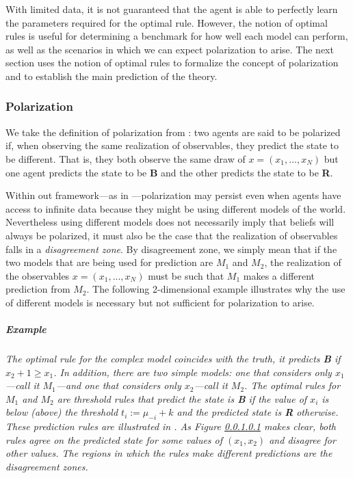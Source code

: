 \documentclass[
  12pt,
]{article}
\begin{document}
With limited data, it is not guaranteed that the agent is able to
perfectly learn the parameters required for the optimal rule. However,
the notion of optimal rules is useful for determining a benchmark for
how well each model can perform, as well as the scenarios in which we
can expect polarization to arise. The next section uses the notion of
optimal rules to formalize the concept of polarization and to establish
the main prediction of the theory.

\hypertarget{polarization}{%
\subsubsection{Polarization}\label{polarization}}

We take the definition of polarization from \citet{Haghtalab2021}: two
agents are said to be polarized if, when observing the same realization
of observables, they predict the state to be different. That is, they
both observe the same draw of \(x=(x_1, ..., x_N)\) but one agent
predicts the state to be \textbf{B} and the other predicts the state to
be \textbf{R}.

Within out framework---as in \citet{Haghtalab2021}---polarization may
persist even when agents have access to infinite data because they might
be using different models of the world. Nevertheless using different
models does not necessarily imply that beliefs will always be polarized,
it must also be the case that the realization of observables falls in a
\emph{disagreement zone}. By disagreement zone, we simply mean that if
the two models that are being used for prediction are \(M_1\) and
\(M_2\), the realization of the observables \(x=(x_1, ..., x_N)\) must
be such that \(M_1\) makes a different prediction from \(M_2\). The
following 2-dimensional example illustrates why the use of different
models is necessary but not sufficient for polarization to arise.

\hypertarget{example}{%
\subparagraph{Example}\label{example}}

\emph{The optimal rule for the complex model coincides with the truth,
it predicts \textbf{B} if \(x_2+1\geq x_1\). In addition, there are two
simple models: one that considers only \(x_1\)---call it \(M_1\)---and
one that considers only \(x_2\)---call it \(M_2\). The optimal rules for
\(M_1\) and \(M_2\) are threshold rules that predict the state is
\textbf{B} if the value of \(x_i\) is below (above) the threshold
\(t_i := \mu_{-i} + k\) and the predicted state is \textbf{R} otherwise.
These prediction rules are illustrated in . As Figure \ref{example}
makes clear, both rules agree on the predicted state for some values of
\((x_1, x_2)\) and disagree for other values. The regions in which the
rules make different predictions are the disagreement zones.}
\end{document}
